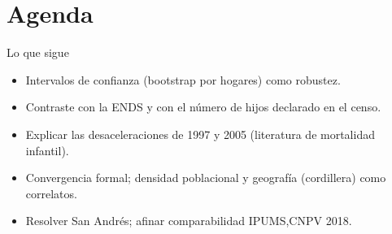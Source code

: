 \documentclass[11pt,aspectratio=169]{beamer}
\begin{document}
\section{Agenda}


\begin{frame}{Lo que sigue}
\begin{itemize}
\item Intervalos de confianza (bootstrap por hogares) como robustez.
\item Contraste con la ENDS y con el n\'umero de hijos declarado en el censo.
\item Explicar las desaceleraciones de 1997 y 2005 (literatura de
mortalidad infantil).
\item Convergencia formal; densidad poblacional y geograf\'ia
(cordillera) como correlatos.
\item Resolver San Andr\'es; afinar comparabilidad IPUMS,CNPV 2018.
\end{itemize}
\end{frame}
\end{document}
